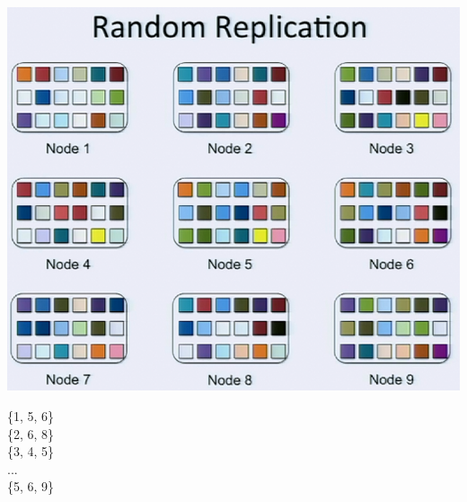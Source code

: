 \documentclass[xcolor=table]{beamer}
\begin{document}
	\begin{frame}
		\begin{minipage}[b]{0.69\linewidth}
			\centering
			\includegraphics[width=1\textwidth]{3.png}
		\end{minipage}
		\begin{minipage}[b]{0.29\linewidth}
			\begin{center}
				\alert{	\{1, 5, 6\}\\
						\{2, 6, 8\}\\
						\{3, 4, 5\}\\
						...\\
						\{5, 6, 9\} }
			\end{center}
		\end{minipage}
	\end{frame}
\end{document}
